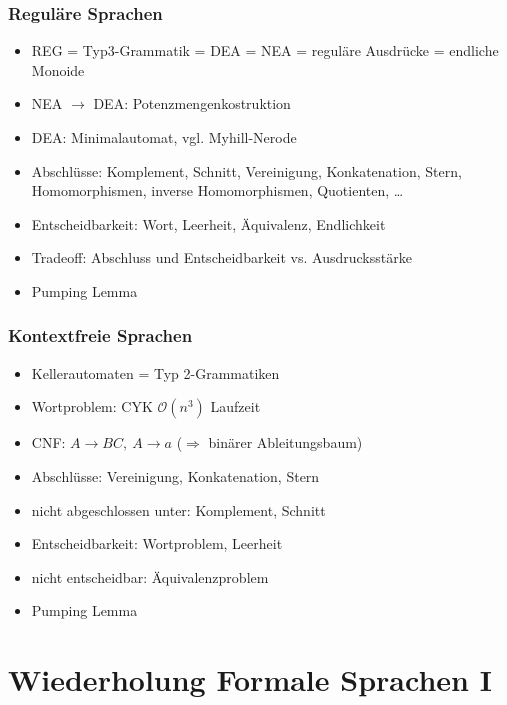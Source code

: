         \subsubsection{Reguläre Sprachen} %
        \label{ssub:intro-reg}
            \begin{itemize}
                \item REG = Typ3-Grammatik = DEA = NEA = reguläre Ausdrücke = endliche Monoide
                \item NEA $\rightarrow$ DEA: Potenzmengenkostruktion
                \item DEA: Minimalautomat, vgl. Myhill-Nerode
                \item Abschlüsse: Komplement, Schnitt, Vereinigung, Konkatenation, Stern, Homomorphismen, inverse Homomorphismen, Quotienten, \dots
                \item Entscheidbarkeit: Wort, Leerheit, Äquivalenz, Endlichkeit
                \item Tradeoff: Abschluss und Entscheidbarkeit vs. Ausdrucksstärke
                \item Pumping Lemma
            \end{itemize}
        \subsubsection{Kontextfreie Sprachen} %
        \label{ssub:intro-kf}
            \begin{itemize}
                \item Kellerautomaten = Typ 2-Grammatiken
                \item Wortproblem: CYK $\mathcal{O}(n^3)$ Laufzeit
                \item CNF: $A\rightarrow BC,\ A\rightarrow a$ ($\Rightarrow$ binärer Ableitungsbaum)
                \item Abschlüsse: Vereinigung, Konkatenation, Stern
                \item nicht abgeschlossen unter: Komplement, Schnitt
                \item Entscheidbarkeit: Wortproblem, Leerheit
                \item nicht entscheidbar: Äquivalenzproblem
                \item Pumping Lemma
            \end{itemize}
\section{Wiederholung Formale Sprachen I}
